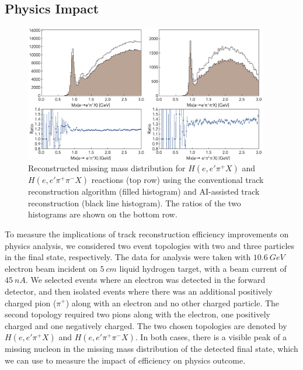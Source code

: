 \documentclass{webofc}
\begin{document}
\subsection{Physics Impact}
\label{physics-impact}

 \begin{figure}[!ht]
\begin{center}
 \includegraphics[width=4.2in]{images/physics_scan.pdf}
\caption {Reconstructed missing mass distribution for $H(e,e'\pi^+X)$ and $H(e,e'\pi^+\pi^-X)$ 
reactions (top row) using the conventional track reconstruction algorithm (filled histogram) and  
AI-assisted track reconstruction (black line histogram). The ratios of the two histograms are shown 
on the bottom row. }
 \label{physics:outcome}
 \end{center}
\end{figure}

To measure the implications of track reconstruction efficiency improvements on physics analysis, 
we considered two event topologies with two and three particles in the final state, respectively. 
The data for analysis were taken with $10.6~GeV$ electron beam incident on $5~cm$ liquid 
hydrogen target, with a beam current of $45~nA$. 
We selected events where an electron was detected in the forward detector, and then isolated 
events where there was an additional positively charged pion ($\pi^+$) along with an electron 
and no other charged particle. The second topology required two pions along with the electron, 
one positively charged and one negatively charged. The two chosen topologies are denoted by 
$H(e,e'\pi^+X)$ and $H(e,e'\pi^+\pi^-X)$. In both cases, there is a visible peak of a missing nucleon
in the missing mass distribution of the detected final state, which we can use to measure the impact 
of efficiency on physics outcome. 
\end{document}
